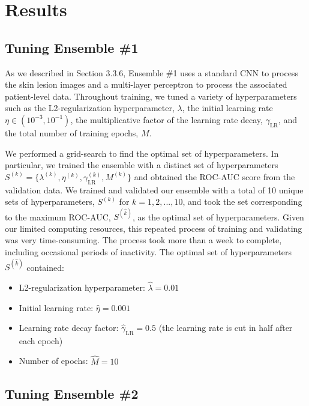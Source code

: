 \documentclass [MAS] {uclathes}
\begin{document}
\chapter{Results}

\section{Tuning Ensemble \#1}

As we described in Section 3.3.6, Ensemble \#1 uses a standard CNN to process the skin lesion images and a multi-layer perceptron to process the associated patient-level data. Throughout training, we tuned a variety of hyperparameters such as the L2-regularization hyperparameter, $\lambda$, the initial learning rate $\eta \in (10^{-3}, 10^{-1})$, the multiplicative factor of the learning rate decay, $\gamma_{\text{LR}}$, and the total number of training epochs, $M$.

We performed a grid-search to find the optimal set of hyperparameters. In particular, we trained the ensemble with a distinct set of hyperparameters $S^{(k)} = \{\lambda^{(k)}, \eta^{(k)}, \gamma_{\text{LR}}^{(k)}, M^{(k)}\}$ and obtained the ROC-AUC score from the validation data. We trained and validated our ensemble with a total of 10 unique sets of hyperparameters, $S^{(k)}$ for $k=1, 2, ..., 10$, and took the set corresponding to the maximum ROC-AUC, $S^{(\hat k)}$, as the optimal set of hyperparameters. Given our limited computing resources, this repeated process of training and validating was very time-consuming. The process took more than a week to complete, including occasional periods of inactivity. The optimal set of hyperparameters $S^{(\hat k)}$ contained:

\begin{itemize}
    \item L2-regularization hyperparameter: $\hat \lambda = 0.01$
    \item Initial learning rate: $\hat \eta = 0.001$
    \item Learning rate decay factor: $\hat \gamma_{\text{LR}} = 0.5$ (the learning rate is cut in half after each epoch)
    \item Number of epochs: $\hat M=10$
\end{itemize}


\section{Tuning Ensemble \#2}
\end{document}
